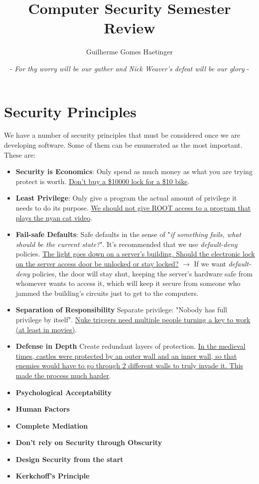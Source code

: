 \documentclass[11pt]{article}
\author{Guilherme Gomes Haetinger}
\date{- \emph{For thy worry will be our gather and Nick Weaver's defeat will be our glory} -}
\title{Computer Security Semester Review}
\begin{document}
\maketitle
\tableofcontents


\section{Security Principles}
\label{sec:orgf18fc7c}
We have a number of security principles that must be considered once we are developing software. Some of them can be enumerated as the most important. These are:
\begin{itemize}
\item \textbf{Security is Economics}: Only spend as much money as what you are trying protect is worth. \uline{Don't buy a \$10000 lock for a \$10 bike}.
\item \textbf{Least Privilege}: Only give a program the actual amount of privilege it needs to do its purpose. \uline{We should not give ROOT access to a program that plays the nyan cat video}.
\item \textbf{Fail-safe Defaults}: Safe defaults in the sense of "\emph{if something fails, what should be the current state?}". It's recommended that we use \emph{default-deny} policies. \uline{The light goes down on a server's building. Should the electronic lock on the server access door be unlocked or stay locked?} \(\to\) If we want \emph{default-deny} policies, the door will stay shut, keeping the server's hardware safe from whomever wants to access it, which will keep it secure from someone who jammed the building's circuits just to get to the computers.
\item \textbf{Separation of Responsibility}
Separate privilege: "Nobody has full privilege by itself". \uline{Nuke triggers need multiple people turning a key to work (at least in movies)}.
\item \textbf{Defense in Depth}
Create redundant layers of protection. \uline{In the medieval times, castles were protected by an outer wall and an inner wall, so that enemies would have to go through 2 different walls to truly invade it. This made the process much harder}.
\item \textbf{Psychological Acceptability}
\item \textbf{Human Factors}
\item \textbf{Complete Mediation}
\item \textbf{Don't rely on Security through Obscurity}
\item \textbf{Design Security from the start}
\item \textbf{Kerkchoff's Principle}
\end{itemize}
\end{document}
